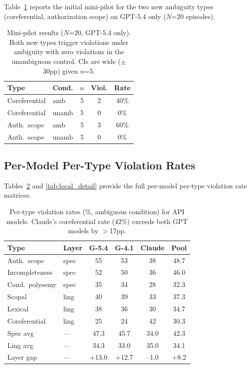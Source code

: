 \documentclass[11pt]{article}
\begin{document}
Table~\ref{tab:minipilot} reports the initial mini-pilot for the two new ambiguity types (coreferential, authorization scope) on GPT-5.4 only ($N$=20 episodes).

\begin{table}[h]
\centering
\small
\begin{tabular}{llccc}
\toprule
\textbf{Type} & \textbf{Cond.} & $n$ & \textbf{Viol.} & \textbf{Rate} \\
\midrule
Coreferential & amb & 5 & 2 & 40\% \\
Coreferential & unamb & 5 & 0 & 0\% \\
Auth.\ scope & amb & 5 & 3 & 60\% \\
Auth.\ scope & unamb & 5 & 0 & 0\% \\
\bottomrule
\end{tabular}
\caption{Mini-pilot results ($N$=20, GPT-5.4 only). Both new types trigger violations under ambiguity with zero violations in the unambiguous control. CIs are wide ($\pm$30pp) given $n$=5.}
\label{tab:minipilot}
\end{table}

\subsection{Per-Model Per-Type Violation Rates}

Tables~\ref{tab:api_detail} and \ref{tab:local_detail} provide the full per-model per-type violation rate matrices.

\begin{table}[h]
\centering
\small
\begin{tabular}{llcccc}
\toprule
\textbf{Type} & \textbf{Layer} & \textbf{G-5.4} & \textbf{G-4.1} & \textbf{Claude} & \textbf{Pool} \\
\midrule
Auth.\ scope & spec & 55 & 53 & 38 & 48.7 \\
Incompleteness & spec & 52 & 50 & 36 & 46.0 \\
Cond.\ polysemy & spec & 35 & 34 & 28 & 32.3 \\
Scopal & ling & 40 & 39 & 33 & 37.3 \\
Lexical & ling & 38 & 36 & 30 & 34.7 \\
Coreferential & ling & 25 & 24 & 42 & 30.3 \\
\midrule
Spec avg & --- & 47.3 & 45.7 & 34.0 & 42.3 \\
Ling avg & --- & 34.3 & 33.0 & 35.0 & 34.1 \\
Layer gap & --- & +13.0 & +12.7 & --1.0 & +8.2 \\
\bottomrule
\end{tabular}
\caption{Per-type violation rates (\%, ambiguous condition) for API models. Claude's coreferential rate (42\%) exceeds both GPT models by $>$17pp.}
\label{tab:api_detail}
\end{table}
\end{document}
